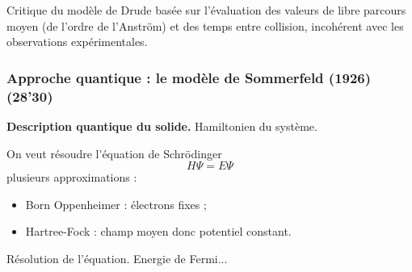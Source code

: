 Critique du modèle de Drude basée sur l'évaluation des valeurs de libre parcours moyen (de l'ordre de l'Anström) et des temps entre collision, incohérent avec les observations expérimentales.

\subsubsection{Approche quantique : le modèle de Sommerfeld (1926) (28'30)}

\begin{slide}
\textbf{Description quantique du solide.}
Hamiltonien du système.
\end{slide}
On veut résoudre l'équation de Schrödinger
\begin{equation}
H\Psi = E\Psi
\end{equation}
\onfait plusieurs approximations :
\begin{itemize}
\item Born Oppenheimer : électrons fixes ;
\item Hartree-Fock : champ moyen donc potentiel constant.
\end{itemize}
Résolution de l'équation.
Energie de Fermi...

\newpage